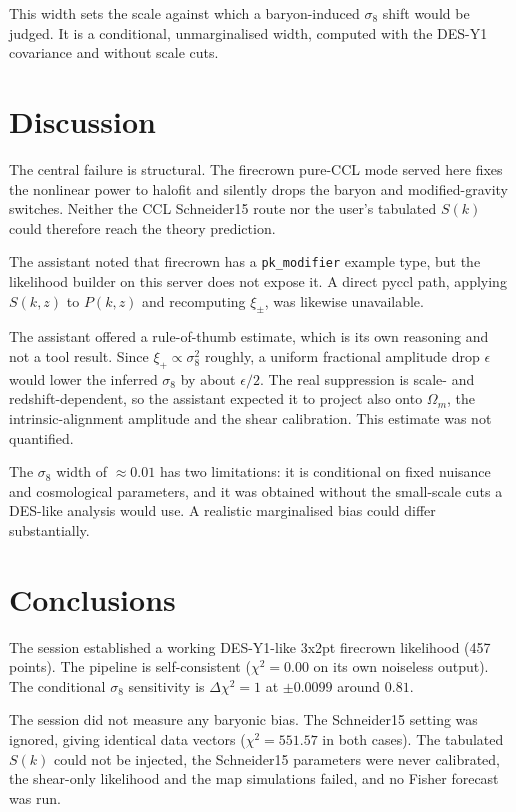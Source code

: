 \documentclass[11pt,a4paper]{article}
\begin{document}
This width sets the scale against which a baryon-induced $\sigma_8$ shift would be judged. It is a conditional, unmarginalised width, computed with the DES-Y1 covariance and without scale cuts.

\section{Discussion}
The central failure is structural. The firecrown pure-CCL mode served here fixes the nonlinear power to halofit and silently drops the baryon and modified-gravity switches. Neither the CCL Schneider15 route nor the user's tabulated $S(k)$ could therefore reach the theory prediction.

The assistant noted that firecrown has a \texttt{pk\_modifier} example type, but the likelihood builder on this server does not expose it. A direct pyccl path, applying $S(k,z)$ to $P(k,z)$ and recomputing $\xi_\pm$, was likewise unavailable.

The assistant offered a rule-of-thumb estimate, which is its own reasoning and not a tool result. Since $\xi_+\propto\sigma_8^2$ roughly, a uniform fractional amplitude drop $\epsilon$ would lower the inferred $\sigma_8$ by about $\epsilon/2$. The real suppression is scale- and redshift-dependent, so the assistant expected it to project also onto $\Omega_m$, the intrinsic-alignment amplitude and the shear calibration. This estimate was not quantified.

The $\sigma_8$ width of $\approx0.01$ has two limitations: it is conditional on fixed nuisance and cosmological parameters, and it was obtained without the small-scale cuts a DES-like analysis would use. A realistic marginalised bias could differ substantially.

\section{Conclusions}
The session established a working DES-Y1-like 3x2pt firecrown likelihood (457 points). The pipeline is self-consistent ($\chi^2=0.00$ on its own noiseless output). The conditional $\sigma_8$ sensitivity is $\Delta\chi^2=1$ at $\pm0.0099$ around $0.81$.

The session did not measure any baryonic bias. The Schneider15 setting was ignored, giving identical data vectors ($\chi^2=551.57$ in both cases). The tabulated $S(k)$ could not be injected, the Schneider15 parameters were never calibrated, the shear-only likelihood and the map simulations failed, and no Fisher forecast was run.
\end{document}
